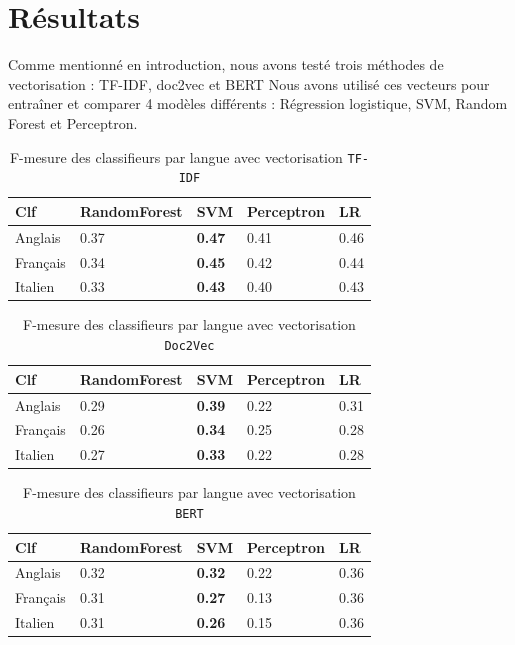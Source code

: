 \section{Résultats}

Comme mentionné en introduction, nous avons testé trois méthodes de vectorisation : TF-IDF, doc2vec et BERT
Nous avons utilisé ces vecteurs pour entraîner et comparer 4 modèles différents : Régression logistique, SVM, Random Forest et Perceptron.


\begin{table}[h]
    \centering
    \begin{tabular}{|l|l|l|l|l|}
        \hline
        Clf & RandomForest & SVM & Perceptron & LR \\
        \hline
        Anglais & 0.37 & \textbf{0.47} & 0.41 & 0.46 \\
        \hline
        Français & 0.34 & \textbf{0.45} & 0.42 & 0.44 \\
        \hline
        Italien & 0.33 & \textbf{0.43} & 0.40 & 0.43 \\
        \hline
    \end{tabular}
    \caption{F-mesure des classifieurs par langue avec vectorisation \texttt{TF-IDF}}
    \label{tab:comparaison_vecteurs}
\end{table}

\begin{table}[h]
    \centering
    \begin{tabular}{|l|l|l|l|l|}
        \hline
        Clf & RandomForest & SVM & Perceptron & LR \\
        \hline
        Anglais & 0.29 & \textbf{0.39} & 0.22 & 0.31 \\
        \hline
        Français & 0.26 & \textbf{0.34} & 0.25 & 0.28 \\
        \hline
        Italien & 0.27 & \textbf{0.33} & 0.22 & 0.28 \\
        \hline
    \end{tabular}
    \caption{F-mesure des classifieurs par langue avec vectorisation \texttt{Doc2Vec}}
    \label{tab:comparaison_vecteurs}
\end{table}

\begin{table}[h]
    \centering
    \begin{tabular}{|l|l|l|l|l|}
        \hline
        Clf & RandomForest & SVM & Perceptron & LR \\
        \hline
        Anglais & 0.32 & \textbf{0.32} & 0.22 & 0.36 \\
        \hline
        Français & 0.31 & \textbf{0.27} & 0.13 & 0.36 \\
        \hline
        Italien & 0.31 & \textbf{0.26} & 0.15 & 0.36 \\
        \hline
    \end{tabular}
    \caption{F-mesure des classifieurs par langue avec vectorisation \texttt{BERT}}
    \label{tab:comparaison_vecteurs}
\end{table}

